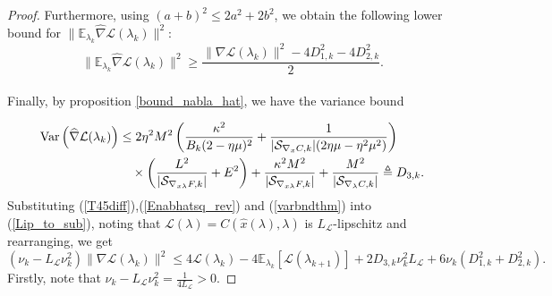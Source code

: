 \documentclass[11pt, twoside]{report}
\begin{document}
\begin{proof}
Furthermore, using $(a+b)^2 \leq 2a^2 + 2b^2$, we obtain the following lower bound for $\|\mathbb{E}_{\lambda_k} \widehat{\nabla} \mathcal{L}(\lambda_k) \|^2$:
\begin{equation} \label{Enabhatsq_rev}
    \|\mathbb{E}_{\lambda_k} \widehat{\nabla} \mathcal{L}(\lambda_k) \|^2 \geq \frac{\|\nabla \mathcal{L}(\lambda_k)\|^2 - 4D_{1,k}^2 -4D_{2,k}^2}{2}.
\end{equation}
\\Finally, by proposition \ref{bound_nabla_hat}, we have the variance bound 

\begin{align}
\mathrm{Var}\left( \widehat{\nabla} \mathcal{L}(\lambda_k) \right) 
&\leq 2\eta^2 M^2 \left( 
    \frac{\kappa^2}{B_k (2 - \eta \mu)^2} 
    + \frac{1}{|\mathcal{S}_{\nabla_{x} C,k}| (2\eta \mu - \eta^2 \mu^2)} 
\right) \notag \\
&\quad \times \left( 
    \frac{L^2}{|\mathcal{S}_{\nabla_{x\lambda} F,k}|} + E^2 
\right) 
+ \frac{\kappa^2 M^2}{|\mathcal{S}_{\nabla_{x\lambda} F,k}|} 
+ \frac{M^2}{|\mathcal{S}_{\nabla_{\lambda} C,k}|} 
\triangleq D_{3,k}.
\label{varbndthm}
\end{align}
Substituting (\ref{T45diff}),(\ref{Enabhatsq_rev}) and (\ref{varbndthm}) into (\ref{Lip_to_sub}), noting that $\mathcal{L}(\lambda) = C(\hat{x}(\lambda),\lambda)$ is $L_\mathcal{L}$-lipschitz and rearranging, we get
\begin{equation} \label{totele3}
    (\nu_k - L_{\mathcal{L}}\nu_k^2)\|\nabla \mathcal{L} (\lambda_k)\|^2 \leq 4\mathcal{L}(\lambda_k) - 4\mathbb{E}_{\lambda_k}\left[\mathcal{L}(\lambda_{k+1})\right]+ 2D_{3,k}\nu_k^2 L_{\mathcal{L}} + 6\nu_k(D_{1,k}^2 + D_{2,k}^2).
\end{equation}
Firstly, note that $\nu_k - L_{\mathcal{L}}\nu_k^2 = \frac{1}{4L_\mathcal{L}} > 0$.

\end{proof}
\end{document}
